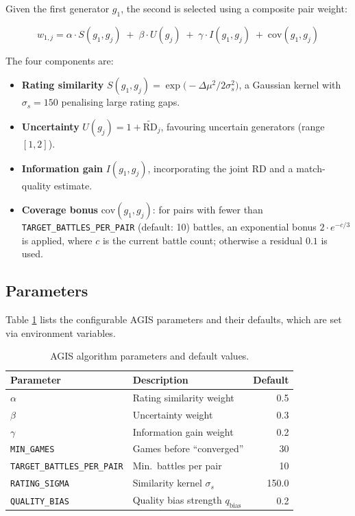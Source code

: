 \documentclass[shortabstract, mgr, english]{iithesis}
\begin{document}
Given the first generator $g_1$, the second is selected using a composite pair weight:

\begin{equation}
\label{eq:agis-w2}
w_{1,j} = \alpha \cdot S(g_1, g_j) \;+\; \beta \cdot U(g_j) \;+\;
           \gamma \cdot I(g_1, g_j) \;+\; \text{cov}(g_1, g_j)
\end{equation}

The four components are:

\begin{itemize}
    \item \textbf{Rating similarity} $S(g_1, g_j) = \exp\!\bigl(-\Delta\mu^2 / 2\sigma_s^2\bigr)$,
          a Gaussian kernel with $\sigma_s = 150$ penalising large rating gaps.
    \item \textbf{Uncertainty} $U(g_j) = 1 + \widetilde{\text{RD}}_j$, favouring
          uncertain generators (range $[1, 2]$).
    \item \textbf{Information gain} $I(g_1, g_j)$, incorporating the joint RD
          and a match-quality estimate.
    \item \textbf{Coverage bonus} $\text{cov}(g_1, g_j)$: for pairs with fewer than
          \texttt{TARGET\_BATTLES\_PER\_PAIR} (default: 10) battles, an exponential
          bonus $2 \cdot e^{-c/3}$ is applied, where $c$ is the current battle count;
          otherwise a residual $0.1$ is used.
\end{itemize}

\subsection{Parameters}
\label{subsec:sd-agis-params}

Table \ref{tab:agis-params} lists the configurable AGIS parameters and their defaults,
which are set via environment variables.

\begin{table}[H]
\centering
\begin{tabular}{llr}
\toprule
\textbf{Parameter} & \textbf{Description} & \textbf{Default} \\
\midrule
$\alpha$ & Rating similarity weight & 0.5 \\
$\beta$  & Uncertainty weight       & 0.3 \\
$\gamma$ & Information gain weight  & 0.2 \\
\texttt{MIN\_GAMES}            & Games before ``converged''  & 30 \\
\texttt{TARGET\_BATTLES\_PER\_PAIR} & Min.\ battles per pair & 10 \\
\texttt{RATING\_SIGMA}        & Similarity kernel $\sigma_s$ & 150.0 \\
\texttt{QUALITY\_BIAS}        & Quality bias strength $q_{\text{bias}}$ & 0.2 \\
\bottomrule
\end{tabular}
\caption{AGIS algorithm parameters and default values.}
\label{tab:agis-params}
\end{table}
\end{document}
